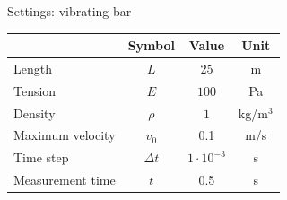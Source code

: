 \documentclass[mathserif,professionalfont,hyperref={pdfpagelabels=false}]{beamer}
\begin{document}
\appendix

\begin{frame}{Settings: vibrating bar}
\begin{table}[h]
\centering
\begin{tabular}{l | c c c}
 & Symbol & Value & Unit \\
\hline
Length& $L$ & 25 & m\\
Tension& $E$ & $ 100$ & Pa\\
Density & $\rho$ & $1$ & kg/m$^3$\\
Maximum velocity & $v_0$ & 0.1 & m/s\\
Time step & $\Delta t$ &$ 1 \cdot10^{-3}$ & s\\
Measurement time & $t$ & 0.5 & s\\
\end{tabular}
\end{table}
\end{frame}

\end{document}
